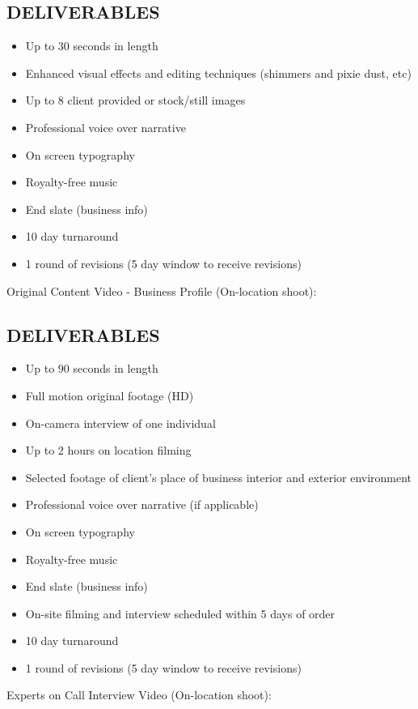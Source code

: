 \documentclass[12pt]{report}
\begin{document}
\subsection{DELIVERABLES}
\begin{itemize}
\item Up to 30 seconds in length
\item Enhanced visual effects and editing techniques (shimmers and pixie dust, etc)
\item Up to 8 client provided or stock/still images
\item Professional voice over narrative
\item On screen typography
\item Royalty-free music
\item End slate (business info)
\item 10 day turnaround
\item 1 round of revisions (5 day window to receive revisions)
\end{itemize}

\item Original Content Video - Business Profile (On-location shoot):
\subsection{DELIVERABLES}
\begin{itemize}
\item Up to 90 seconds in length
\item Full motion original footage (HD)
\item On-camera interview of one individual
\item Up to 2 hours on location filming
\item Selected footage of client's place of business interior and exterior environment
\item Professional voice over narrative (if applicable)
\item On screen typography
\item Royalty-free music
\item End slate (business info)
\item On-site filming and interview scheduled within 5 days of order
\item 10 day turnaround
\item 1 round of revisions (5 day window to receive revisions)
\end{itemize}

\item Experts on Call Interview Video (On-location shoot):
\end{document}
